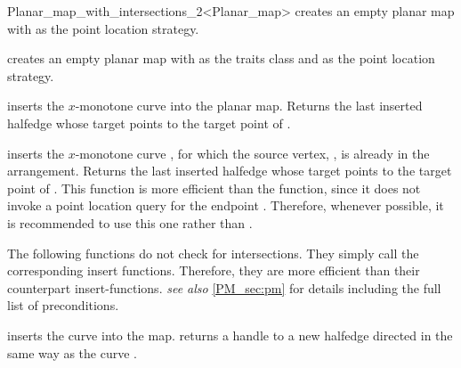 \begin{ccRefClass}{Planar_map_with_intersections_2<Planar_map>}
    {creates an empty planar map with  as the point location strategy.}

    {creates an empty planar map with  as the traits class and  as the point location strategy.}

\ccOperations


      {inserts the $x$-monotone curve  into the planar map.
      Returns the last inserted halfedge whose target points to the
      target point of .
       }

      {inserts  the $x$-monotone curve , for
       which the source vertex, , is already in the
       arrangement.
       Returns the last inserted halfedge whose target points to the
       target point of .
       This function is more efficient than the  function,
       since it does not invoke a point location query for the
       endpoint . Therefore,
       whenever possible, it is recommended to use this one rather
       than .
       }

\begin{ccAdvanced}


The following functions do not check for intersections. They simply
call the  corresponding insert functions. Therefore,
they are more efficient than their counterpart insert-functions.
{\em see also} \ref{PM_sec:pm} for details including the full list of
preconditions.

  {inserts the curve  into the
  map.  returns a handle to a new
  halfedge directed in the same way as the curve .
  }


\end{ccAdvanced}
\end{ccRefClass}

